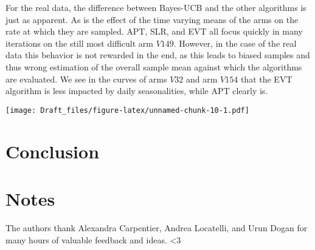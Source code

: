 \documentclass[12pt,]{article}
\begin{document}
For the real data, the difference between Bayes-UCB and the other
algorithms is just as apparent. As is the effect of the time varying
means of the arms on the rate at which they are sampled. APT, SLR, and
EVT all focus quickly in many iterations on the still most difficult arm
\(V149\). However, in the case of the real data this behavior is not
rewarded in the end, as this leads to biased samples and thus wrong
estimation of the overall sample mean against which the algorithms are
evaluated. We see in the curves of arms \(V32\) and arm \(V154\) that
the EVT algorithm is less impacted by daily seasonalities, while APT
clearly is.

\texttt{[image: Draft\_files/figure-latex/unnamed-chunk-10-1.pdf]}

\section{Conclusion}\label{conclusion}

\section{Notes}\label{notes}

The authors thank Alexandra Carpentier, Andrea Locatelli, and Urun Dogan
for many hours of valuable feedback and ideas. \textless{}3
\end{document}
